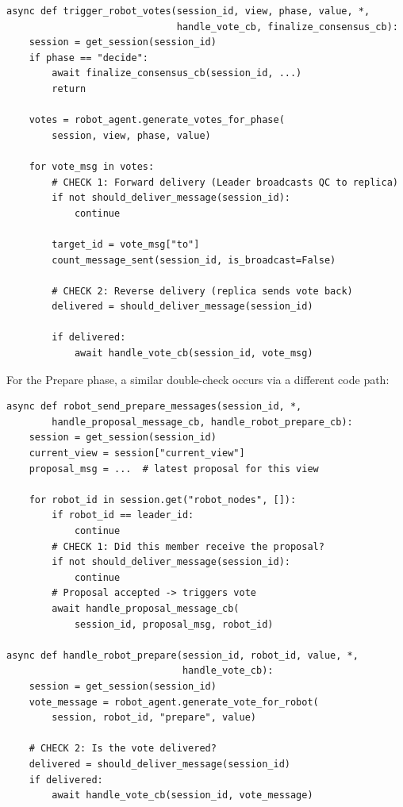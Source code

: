 \documentclass[12pt,a4paper]{article}
\begin{document}
\begin{lstlisting}[caption={Double delivery check in vote trigger (\texttt{robot\_agent.py})}, label=lst:trigger]
async def trigger_robot_votes(session_id, view, phase, value, *,
                              handle_vote_cb, finalize_consensus_cb):
    session = get_session(session_id)
    if phase == "decide":
        await finalize_consensus_cb(session_id, ...)
        return

    votes = robot_agent.generate_votes_for_phase(
        session, view, phase, value)

    for vote_msg in votes:
        # CHECK 1: Forward delivery (Leader broadcasts QC to replica)
        if not should_deliver_message(session_id):
            continue

        target_id = vote_msg["to"]
        count_message_sent(session_id, is_broadcast=False)

        # CHECK 2: Reverse delivery (replica sends vote back)
        delivered = should_deliver_message(session_id)

        if delivered:
            await handle_vote_cb(session_id, vote_msg)
\end{lstlisting}

For the Prepare phase, a similar double-check occurs via a different code path:

\begin{lstlisting}[caption={Prepare phase delivery (\texttt{robot\_agent.py})}, label=lst:prepare]
async def robot_send_prepare_messages(session_id, *,
        handle_proposal_message_cb, handle_robot_prepare_cb):
    session = get_session(session_id)
    current_view = session["current_view"]
    proposal_msg = ...  # latest proposal for this view

    for robot_id in session.get("robot_nodes", []):
        if robot_id == leader_id:
            continue
        # CHECK 1: Did this member receive the proposal?
        if not should_deliver_message(session_id):
            continue
        # Proposal accepted -> triggers vote
        await handle_proposal_message_cb(
            session_id, proposal_msg, robot_id)

async def handle_robot_prepare(session_id, robot_id, value, *,
                               handle_vote_cb):
    session = get_session(session_id)
    vote_message = robot_agent.generate_vote_for_robot(
        session, robot_id, "prepare", value)

    # CHECK 2: Is the vote delivered?
    delivered = should_deliver_message(session_id)
    if delivered:
        await handle_vote_cb(session_id, vote_message)
\end{lstlisting}
\end{document}

